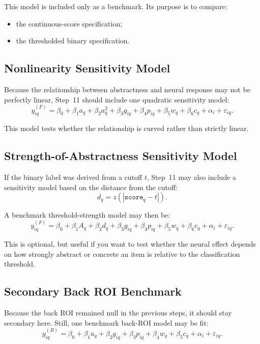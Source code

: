 This model is included only as a benchmark.
Its purpose is to compare:
\begin{itemize}
    \item the continuous-score specification;
    \item the thresholded binary specification.
\end{itemize}

\subsection{Nonlinearity Sensitivity Model}
Because the relationship between abstractness and neural response may not be perfectly linear,
Step~11 should include one quadratic sensitivity model:
\begin{equation}
y^{(F)}_{iq}
=
\beta_0
+
\beta_1 a_q
+
\beta_2 a_q^2
+
\beta_3 g_{iq}
+
\beta_4 p_{iq}
+
\beta_5 w_q
+
\beta_6 c_q
+
\alpha_i
+
\varepsilon_{iq}.
\end{equation}

This model tests whether the relationship is curved rather than strictly linear.

\subsection{Strength-of-Abstractness Sensitivity Model}
If the binary label was derived from a cutoff \(t\), Step~11 may also include a sensitivity model
based on the distance from the cutoff:
\begin{equation}
d_q = z(|\texttt{score}_q - t|).
\end{equation}

A benchmark threshold-strength model may then be:
\begin{equation}
y^{(F)}_{iq}
=
\beta_0
+
\beta_1 A_q
+
\beta_2 d_q
+
\beta_3 g_{iq}
+
\beta_4 p_{iq}
+
\beta_5 w_q
+
\beta_6 c_q
+
\alpha_i
+
\varepsilon_{iq}.
\end{equation}

This is optional, but useful if you want to test whether the neural effect depends on how strongly
abstract or concrete an item is relative to the classification threshold.

\subsection{Secondary Back ROI Benchmark}
Because the back ROI remained null in the previous steps, it should stay secondary here.
Still, one benchmark back-ROI model may be fit:
\begin{equation}
y^{(B)}_{iq}
=
\beta_0
+
\beta_1 a_q
+
\beta_2 g_{iq}
+
\beta_3 p_{iq}
+
\beta_4 w_q
+
\beta_5 c_q
+
\alpha_i
+
\varepsilon_{iq}.
\end{equation}

